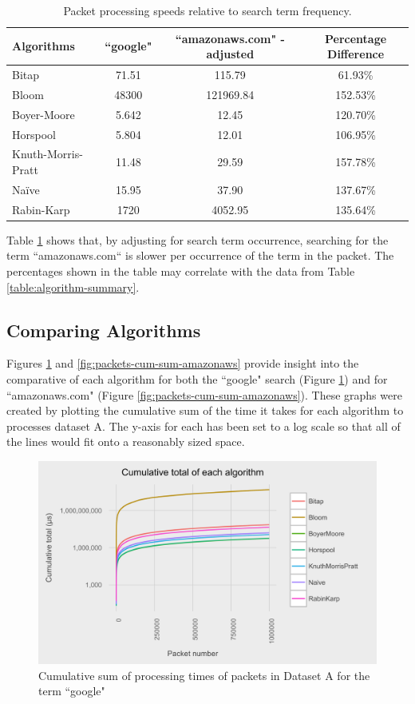 \documentclass{article}
\begin{document}
\begin{table}[hbt]
  \centering
  \begin{tabular}{l|ccc}
    Algorithms & ``google" & ``amazonaws.com" - adjusted & Percentage Difference\\
    \hline
    Bitap & 71.51 & 115.79 & 61.93\%\\
    Bloom & 48300 & 121969.84 & 152.53\%\\
    Boyer-Moore & 5.642 & 12.45 & 120.70\%\\
    Horspool & 5.804 & 12.01 & 106.95\%\\
    Knuth-Morris-Pratt & 11.48 & 29.59 & 157.78\%\\
    Na{\"i}ve & 15.95 & 37.90 & 137.67\%\\
    Rabin-Karp & 1720 & 4052.95 & 135.64\%
  \end{tabular}
  \caption{Packet processing speeds relative to search term frequency.}
  \label{table:packet-adjusted}
\end{table}

Table \ref{table:packet-adjusted} shows that, by adjusting for search term occurrence, searching for the term ``amazonaws.com`` is slower per occurrence of the term in the packet. The percentages shown in the table may correlate with the data from Table \ref{table:algorithm-summary}.

\subsection{Comparing Algorithms}

Figures \ref{fig:packets-cum-sum-google} and \ref{fig:packets-cum-sum-amazonaws} provide insight into the comparative of each algorithm for both the ``google" search (Figure \ref{fig:packets-cum-sum-google}) and for ``amazonaws.com" (Figure \ref{fig:packets-cum-sum-amazonaws}). These graphs were created by plotting the cumulative sum of the time it takes for each algorithm to processes dataset A. The y-axis for each has been set to a log scale so that all of the lines would fit onto a reasonably sized space. 

\begin{figure}[h!bt]
  \centering
  \includegraphics[width=\textwidth]{graphs/cum_sum_packets_google.png}
  \caption{Cumulative sum of processing times of packets in Dataset A for the term ``google"}
  \label{fig:packets-cum-sum-google}
\end{figure}
\end{document}
